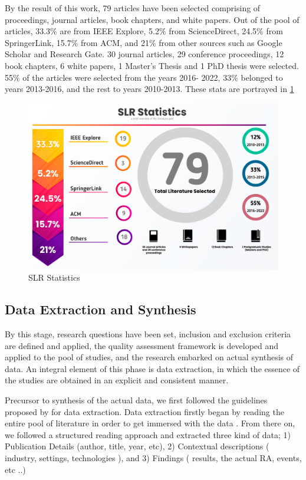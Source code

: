 \documentclass[review]{elsarticle}
\begin{document}
By the result of this work, 79 articles have been selected comprising of proceedings, journal articles, book chapters, and white papers. Out of the pool of articles, 33.3\% are from IEEE Explore, 5.2\% from ScienceDirect, 24.5\% from SpringerLink, 15.7\% from ACM, and 21\% from other sources such as Google Scholar and Research Gate. 30 journal articles, 29 conference proceedings, 12 book chapters, 6 white papers, 1 Master’s Thesis and 1 PhD thesis were selected. 55\% of the articles were selected from the years 2016- 2022, 33\% belonged to years 2013-2016, and the rest to years 2010-2013. These stats are portrayed in \ref{fig:SLRStats}

\begin{figure}[t]
    \includegraphics[width=13cm]{Media/databases-statitistic-[Recovered].png}
    \caption{SLR Statistics}
    \label{fig:SLRStats}
\end{figure}

\subsection{Data Extraction and Synthesis}

By this stage, research questions have been set, inclusion and exclusion criteria are defined and applied, the quality assessment framework is developed and applied to the pool of studies, and the research embarked on actual synthesis of data. An integral element of this phase is data extraction, in which the essence of the studies are obtained in an explicit and consistent manner.

Precursor to synthesis of the actual data, we first followed the guidelines proposed by \cite{cruzes2011recommended} for data extraction. Data extraction firstly began by reading the entire pool of literature in order to get immersed with the data \cite{braun2006using}. From there on, we followed a structured reading approach and extracted three kind of data; 1) Publication Details (author, title, year, etc), 2) Contextual descriptions ( industry, settings, technologies ), and 3) Findings ( results, the actual RA, events, etc ..)
\end{document}
